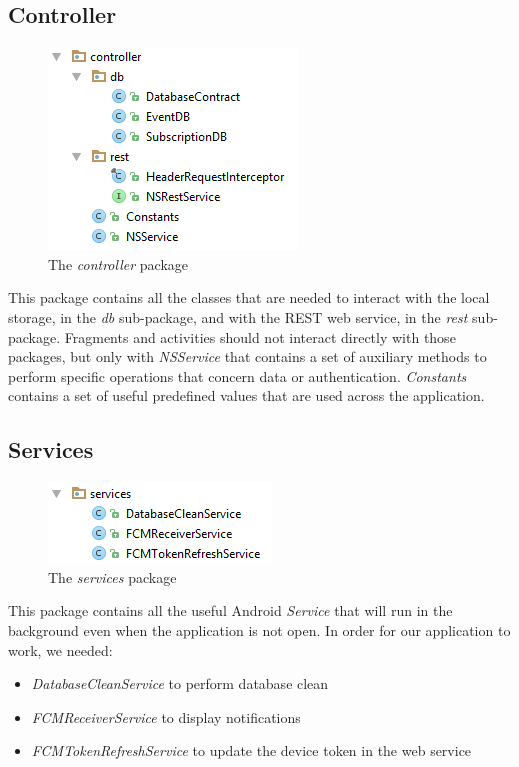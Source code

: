 \documentclass[a4paper]{scrreprt}
\begin{document}
\subsection{Controller}
\begin{figure}[H]
	\centering
	\includegraphics{imgs/pack_controller}
	\caption{The \emph{controller} package}
\end{figure}
This package contains all the classes that are needed to interact with the local storage, in the \emph{db} sub-package, and with the REST web service, in the \emph{rest} sub-package. Fragments and activities should not interact directly with those packages, but only with \emph{NSService} that contains a set of auxiliary methods to perform specific operations that concern data or authentication. \emph{Constants} contains a set of useful predefined values that are used across the application.

\subsection{Services}
\begin{figure}[H]
	\centering
	\includegraphics{imgs/pack_services}
	\caption{The \emph{services} package}
\end{figure}
This package contains all the useful Android \emph{Service} that will run in the background even when the application is not open. In order for our application to work, we needed:
\begin{itemize}
	\item \emph{DatabaseCleanService} to perform database clean
	\item \emph{FCMReceiverService} to display notifications
	\item \emph{FCMTokenRefreshService} to update the device token in the web service
\end{itemize}
\end{document}

